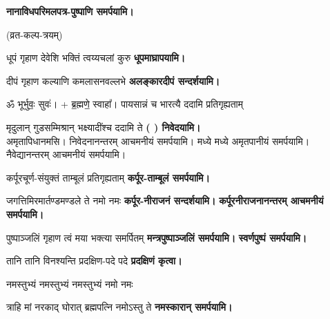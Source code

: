 \begingroup
\centering
\setlength{\columnseprule}{1pt}
\let\chapt\sect
\needspace{6em}




\endgroup

\textbf{\devAya{} नानाविध\-परिमल\-पत्र-पुष्पाणि समर्पयामि।}

\centerline{\small{(व्रत-कल्प-त्रयम्)}}
\begin{center}

{धूपं गृहाण देवेशि भक्तिं त्वय्यचलां कुरु}
\textbf{\devAya{} धूपमाघ्रापयामि।}
\medskip

{दीपं गृहाण कल्याणि कमलासनवल्लभे}
\textbf{\devAya{} अलङ्कारदीपं सन्दर्शयामि।}
\medskip

ॐ भूर्भुवः॒ सुवः॑। + ब्र॒ह्मणे॒ स्वाहा᳚।
{पायसान्नं च भारत्यै ददामि प्रतिगृह्यताम्}

{मृदुलान् गुडसम्मिश्रान् भक्ष्यादींश्च ददामि ते}
\textbf{\devAya (   ) निवेदयामि।}\\
अमृतापिधानमसि। निवेदनानन्तरम् आचमनीयं समर्पयामि।
मध्ये मध्ये अमृतपानीयं समर्पयामि।
नैवेद्यानन्तरम् आचमनीयं समर्पयामि।
\medskip

{कर्पूरचूर्ण-संयुक्तं ताम्बूलं प्रतिगृह्यताम्}
\textbf{\devAya{} कर्पूर-ताम्बूलं समर्पयामि।}
\medskip

{जगत्तिमिरमार्तण्डमण्डले ते नमो नमः}
\textbf{\devAya{} कर्पूर-नीराजनं सन्दर्शयामि।}
\textbf{कर्पूरनीराजनानन्तरम् आचमनीयं समर्पयामि।}
\medskip

{पुष्पाञ्जलिं गृहाण त्वं मया भक्त्या समर्पितम्}
\textbf{\devAya{} मन्त्रपुष्पाञ्जलिं समर्पयामि।}
\textbf{स्वर्णपुष्पं समर्पयामि।}
\medskip

{तानि तानि विनश्यन्ति प्रदक्षिण-पदे पदे}
\textbf{प्रदक्षिणं कृत्वा।}
\medskip

{नमस्तुभ्यं नमस्तुभ्यं नमस्तुभ्यं नमो नमः}

{त्राहि मां नरकाद् घोरात् ब्रह्मपत्नि नमोऽस्तु ते}
\textbf{\devAya{} नमस्कारान् समर्पयामि।}
\medskip


\end{center}
